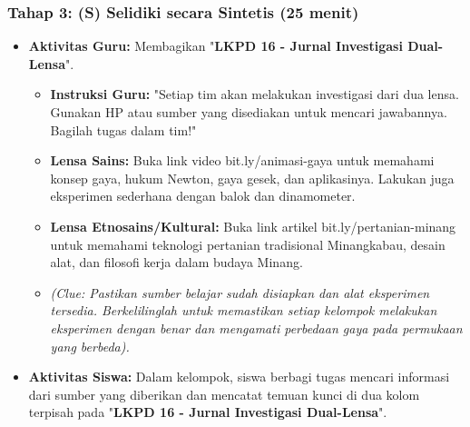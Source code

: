 \documentclass[12pt,a4paper]{article}
\begin{document}
\subsubsection{Tahap 3: (S) Selidiki secara Sintetis (25 menit)}
\begin{itemize}
\item \textbf{Aktivitas Guru:} Membagikan "\textbf{LKPD 16 - Jurnal Investigasi Dual-Lensa}".
    \begin{itemize}
    \item \textbf{Instruksi Guru:} "Setiap tim akan melakukan investigasi dari dua lensa. Gunakan HP atau sumber yang disediakan untuk mencari jawabannya. Bagilah tugas dalam tim!"
    \item \textbf{Lensa Sains:} Buka link video bit.ly/animasi-gaya untuk memahami konsep gaya, hukum Newton, gaya gesek, dan aplikasinya. Lakukan juga eksperimen sederhana dengan balok dan dinamometer.
    \item \textbf{Lensa Etnosains/Kultural:} Buka link artikel bit.ly/pertanian-minang untuk memahami teknologi pertanian tradisional Minangkabau, desain alat, dan filosofi kerja dalam budaya Minang.
    \item \textit{(Clue: Pastikan sumber belajar sudah disiapkan dan alat eksperimen tersedia. Berkelilinglah untuk memastikan setiap kelompok melakukan eksperimen dengan benar dan mengamati perbedaan gaya pada permukaan yang berbeda).}
    \end{itemize}
\item \textbf{Aktivitas Siswa:} Dalam kelompok, siswa berbagi tugas mencari informasi dari sumber yang diberikan dan mencatat temuan kunci di dua kolom terpisah pada "\textbf{LKPD 16 - Jurnal Investigasi Dual-Lensa}".
\end{itemize}
\end{document}
